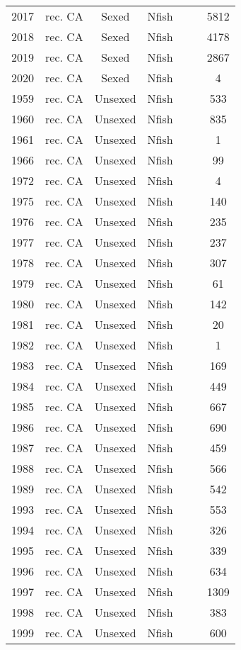 \begin{longtable}[t]{c>{\centering\arraybackslash}p{3cm}ccccc}
2017 & rec. CA & Sexed & Nfish &  &  & 5812\\
2018 & rec. CA & Sexed & Nfish &  &  & 4178\\
2019 & rec. CA & Sexed & Nfish &  &  & 2867\\
2020 & rec. CA & Sexed & Nfish &  &  & 4\\
1959 & rec. CA & Unsexed & Nfish &  &  & 533\\
1960 & rec. CA & Unsexed & Nfish &  &  & 835\\
1961 & rec. CA & Unsexed & Nfish &  &  & 1\\
1966 & rec. CA & Unsexed & Nfish &  &  & 99\\
1972 & rec. CA & Unsexed & Nfish &  &  & 4\\
1975 & rec. CA & Unsexed & Nfish &  &  & 140\\
1976 & rec. CA & Unsexed & Nfish &  &  & 235\\
1977 & rec. CA & Unsexed & Nfish &  &  & 237\\
1978 & rec. CA & Unsexed & Nfish &  &  & 307\\
1979 & rec. CA & Unsexed & Nfish &  &  & 61\\
1980 & rec. CA & Unsexed & Nfish &  &  & 142\\
1981 & rec. CA & Unsexed & Nfish &  &  & 20\\
1982 & rec. CA & Unsexed & Nfish &  &  & 1\\
1983 & rec. CA & Unsexed & Nfish &  &  & 169\\
1984 & rec. CA & Unsexed & Nfish &  &  & 449\\
1985 & rec. CA & Unsexed & Nfish &  &  & 667\\
1986 & rec. CA & Unsexed & Nfish &  &  & 690\\
1987 & rec. CA & Unsexed & Nfish &  &  & 459\\
1988 & rec. CA & Unsexed & Nfish &  &  & 566\\
1989 & rec. CA & Unsexed & Nfish &  &  & 542\\
1993 & rec. CA & Unsexed & Nfish &  &  & 553\\
1994 & rec. CA & Unsexed & Nfish &  &  & 326\\
1995 & rec. CA & Unsexed & Nfish &  &  & 339\\
1996 & rec. CA & Unsexed & Nfish &  &  & 634\\
1997 & rec. CA & Unsexed & Nfish &  &  & 1309\\
1998 & rec. CA & Unsexed & Nfish &  &  & 383\\
1999 & rec. CA & Unsexed & Nfish &  &  & 600\\

\end{longtable}
